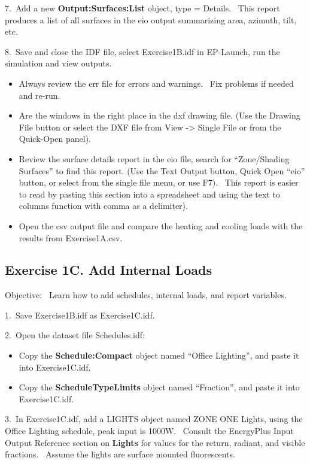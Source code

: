 7.~Add a new \textbf{Output:Surfaces:List} object, type = Details.~ This report produces a list of all surfaces in the eio output summarizing area, azimuth, tilt, etc.

8.~Save and close the IDF file, select Exercise1B.idf in EP-Launch, run the simulation and view outputs.

\begin{itemize}
\item
  Always review the err file for errors and warnings.~ Fix problems if needed and re-run.
\item
  Are the windows in the right place in the dxf drawing file. (Use the Drawing File button or select the DXF file from View -\textgreater{} Single File or from the Quick-Open panel).
\item
  Review the surface details report in the eio file, search for ``Zone/Shading Surfaces'' to find this report. (Use the Text Output button, Quick Open ``eio'' button, or select from the single file menu, or use F7).~ This report is easier to read by pasting this section into a spreadsheet and using the text to columns function with comma as a delimiter).
\item
  Open the csv output file and compare the heating and cooling loads with the results from Exercise1A.csv.
\end{itemize}

\subsection{Exercise 1C. Add Internal Loads}\label{exercise-1c.-add-internal-loads}

Objective:~ Learn how to add schedules, internal loads, and report variables.

1.~Save Exercise1B.idf as Exercise1C.idf.

2.~Open the dataset file Schedules.idf:

\begin{itemize}
\item
  Copy the \textbf{Schedule:Compact} object named ``Office Lighting'', and paste it into Exercise1C.idf.
\item
  Copy the \textbf{ScheduleTypeLimits} object named ``Fraction'', and paste it into Exercise1C.idf.
\end{itemize}

3.~In Exercise1C.idf, add a LIGHTS object named ZONE ONE Lights, using the Office Lighting schedule, peak input is 1000W.~ Consult the EnergyPlus Input Output Reference section on \textbf{Lights} for values for the return, radiant, and visible fractions.~ Assume the lights are surface mounted fluorescents.

